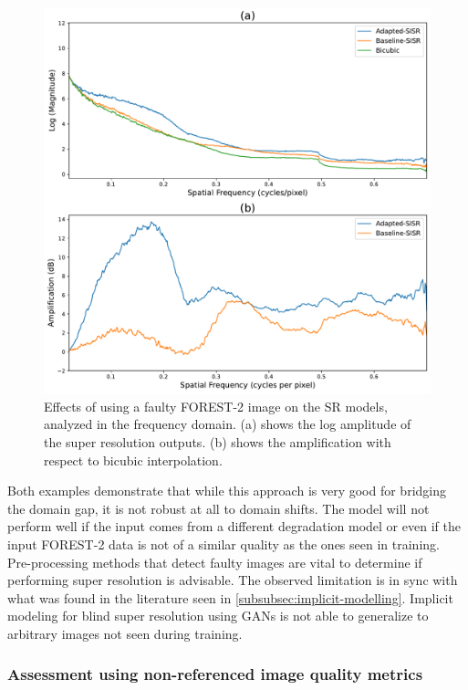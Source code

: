  \begin{figure}[H]
        \centering
        \includegraphics[scale= 0.38]{Includes/5-target-prediction-with-domain-gap-from-forest-fft.pdf}
        \caption{\small{Effects of using a faulty FOREST-2 image on the SR models, analyzed in the frequency domain. (a) shows the log amplitude of the super resolution outputs. (b) shows the amplification with respect to bicubic interpolation.}}
        \label{fig:5-target-prediction-with-domain-gap-from-forest-fft.pdf}
    \end{figure}
    
    Both examples demonstrate that while this approach is very good for bridging the domain gap, it is not robust at all to domain shifts. The model will not perform well if the input comes from a different degradation model or even if the input FOREST-2 data is not of a similar quality as the ones seen in training. Pre-processing methods that detect faulty images are vital to determine if performing super resolution is advisable. 
    The observed limitation is in sync with what was found in the literature seen in \ref{subsubsec:implicit-modelling}. Implicit modeling for blind super resolution using GANs is not able to generalize to arbitrary images not seen during training.

    \subsubsection{Assessment using non-referenced image quality metrics}
    
